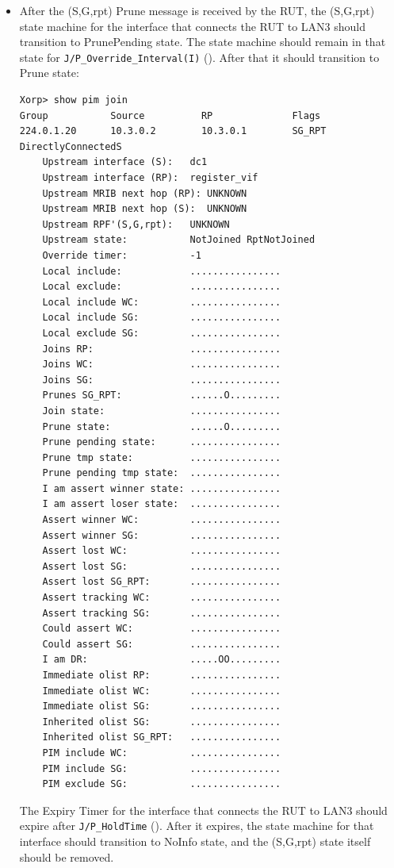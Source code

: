 \documentclass[11pt]{report}
\begin{document}

\begin{itemize}

  \item After the (S,G,rpt) Prune message is received by the RUT,
  the (S,G,rpt) state machine for the interface that connects the RUT to
  LAN3 should transition to PrunePending state. The state machine should
  remain in that state for \verb=J/P_Override_Interval(I)=
  ({\PimsmJPOverrideIntervalI}). After that it should transition to Prune
  state:

\begin{verbatim}
Xorp> show pim join 
Group           Source          RP              Flags
224.0.1.20      10.3.0.2        10.3.0.1        SG_RPT DirectlyConnectedS 
    Upstream interface (S):   dc1
    Upstream interface (RP):  register_vif
    Upstream MRIB next hop (RP): UNKNOWN
    Upstream MRIB next hop (S):  UNKNOWN
    Upstream RPF'(S,G,rpt):   UNKNOWN
    Upstream state:           NotJoined RptNotJoined 
    Override timer:           -1
    Local include:            ................
    Local exclude:            ................
    Local include WC:         ................
    Local include SG:         ................
    Local exclude SG:         ................
    Joins RP:                 ................
    Joins WC:                 ................
    Joins SG:                 ................
    Prunes SG_RPT:            ......O.........
    Join state:               ................
    Prune state:              ......O.........
    Prune pending state:      ................
    Prune tmp state:          ................
    Prune pending tmp state:  ................
    I am assert winner state: ................
    I am assert loser state:  ................
    Assert winner WC:         ................
    Assert winner SG:         ................
    Assert lost WC:           ................
    Assert lost SG:           ................
    Assert lost SG_RPT:       ................
    Assert tracking WC:       ................
    Assert tracking SG:       ................
    Could assert WC:          ................
    Could assert SG:          ................
    I am DR:                  .....OO.........
    Immediate olist RP:       ................
    Immediate olist WC:       ................
    Immediate olist SG:       ................
    Inherited olist SG:       ................
    Inherited olist SG_RPT:   ................
    PIM include WC:           ................
    PIM include SG:           ................
    PIM exclude SG:           ................
\end{verbatim}

  The Expiry Timer for the interface that connects the RUT to LAN3
  should expire after \verb=J/P_HoldTime= ({\PimsmJPHoldTime}).
  After it expires, the state machine for that interface should transition to
  NoInfo state, and the (S,G,rpt) state itself should be removed.

\end{itemize}
\end{document}
